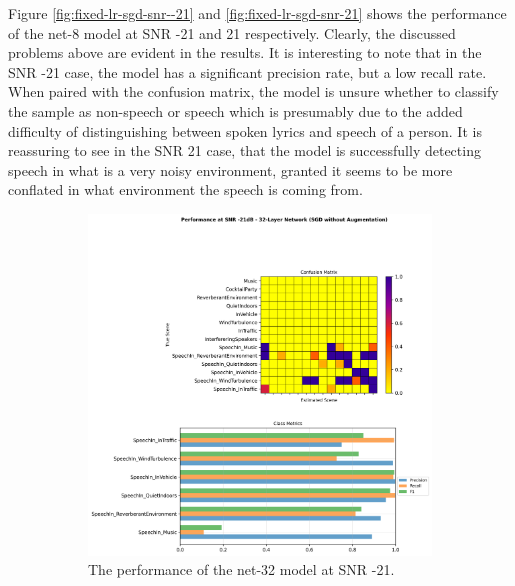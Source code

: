 \documentclass[logo,bsc,singlespacing,parskip,online]{infthesis}
\begin{document}
Figure \ref{fig:fixed-lr-sgd-snr--21} and \ref{fig:fixed-lr-sgd-snr-21} shows 
the performance of the net-8 model at SNR -21 and 21 respectively.
Clearly, the discussed problems above are evident in the results. 
It is interesting to note that in the SNR -21 case, 
the model has a significant precision rate, but a low recall rate. 
When paired with the confusion matrix, the model 
is unsure whether to classify the sample as non-speech or speech
which is presumably due to the added difficulty of distinguishing 
between spoken lyrics and speech of a person. 
It is reassuring to see in the SNR 21 case, that the model 
is successfully detecting speech in what is a very noisy environment,
granted it seems to be more conflated in what environment the speech is coming from.

\begin{figure}[h]
   \centering
   \begin{subfigure}[b]{0.48\textwidth}
      \centering
      \includegraphics[width=\textwidth]{net-32/FIXED-fixed-lr-sgd/snr_-21_performance.png}
      \caption{The performance of the net-32 model at SNR -21.}
      \label{fig:fixed-lr-sgd-snr--21-net-32}
   \end{subfigure}
   \hfill
   \begin{subfigure}[b]{0.48\textwidth}  
         \centering

\end{subfigure}
\end{figure}
\end{document}
